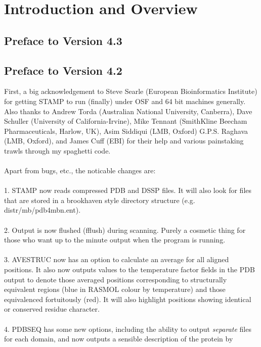 \tableofcontents

\parindent 0in

\chapter{Introduction and Overview}
\section{Preface to Version 4.3}


\section{Preface to Version 4.2}

First, a big acknowledgement to Steve Searle (European Bioinformatics Institute)
for getting STAMP to run (finally) under OSF and 64 bit machines generally.
Also thanks to Andrew Torda 
(Australian National University, Canberra), Dave Schuller (University of California-Irvine),
Mike Tennant (SmithKline Beecham Pharmaceuticals, Harlow, UK),
Asim Siddiqui (LMB, Oxford) G.P.S. Raghava (LMB, Oxford), and James Cuff (EBI)
for their help and various painstaking trawls through my spaghetti code.\\
\\
Apart from bugs, etc., the noticable changes are:\\
\\
1. STAMP now reads compressed PDB and DSSP files.  It will also look for files that
are stored in a brookhaven style directory structure (e.g. distr/mb/pdb4mbn.ent).\\
\\
2. Output is now flushed (fflush) during scanning.  Purely a cosmetic thing for those who
want up to the minute output when the program is running.\\
\\
3. AVESTRUC now has an option to calculate an average for all aligned positions.  It also
now outputs values to the temperature factor fields in the PDB output to denote those
averaged positions corresponding to structurally equivalent regions (blue in RASMOL 
colour by temperature) and those equivalenced fortuitously (red).  It will also highlight
positions showing identical or conserved residue character.\\
\\
4. PDBSEQ has some new options, including the ability to output {\em separate} files
for each domain, and now outputs a sensible description of the protein by
